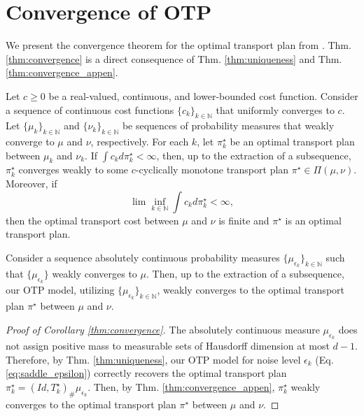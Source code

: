 \section{Convergence of OTP} \label{appen:conv_result_from_oldandnew}
We present the convergence theorem for the optimal transport plan from \citet{villani}. Thm. \ref{thm:convergence} is a direct consequence of Thm. \ref{thm:uniqueness} and Thm. \ref{thm:convergence_appen}.
\begin{theorem} \label{thm:convergence_appen}
    Let $c \ge 0$ be a real-valued, continuous, and lower-bounded cost function. Consider a sequence of continuous cost functions $\{c_k\}_{k\in \mathbb{N}}$ that uniformly converges to $c$.
    Let $\{\mu_k\}_{k\in \mathbb{N}}$ and $\{\nu_k\}_{k\in \mathbb{N}}$ be sequences of probability measures that weakly converge to $\mu$ and $\nu$, respectively. For each $k$, let $\pi^{\star}_k$ be an optimal transport plan between $\mu_k$ and $\nu_k$. If $\int c_k d\pi^{\star}_k <\infty$, then, up to the extraction of a subsequence, $\pi^{\star}_k$ converges weakly to some $c$-cyclically monotone transport plan $\pi^{\star} \in \Pi(\mu, \nu)$. Moreover, if
    \begin{equation}
        \lim\inf_{k\in\mathbb{N}} \int c_k d\pi^{\star}_k < \infty,
    \end{equation}
    then the optimal transport cost between $\mu$ and $\nu$ is finite and $\pi^{\star}$ is an optimal transport plan.
\end{theorem}

\begin{corollary} 
    Consider a sequence absolutely continuous probability measures $\{\mu_{\epsilon_k}\}_{k\in \mathbb{N}}$ such that $\{\mu_{\epsilon_k}\}$ weakly converges to $\mu$. Then, up to the extraction of a subsequence, our OTP model, utilizing $\{\mu_{\epsilon_k}\}_{k\in \mathbb{N}}$, weakly converges to the optimal transport plan $\pi^{\star}$ between $\mu$ and $\nu$.
\end{corollary}

\begin{proof}[Proof of Corollary \ref{thm:convergence}]
The absolutely continuous measure $\mu_{\epsilon_k}$ does not assign positive mass to measurable sets of Hausdorff dimension at most $d-1$. Therefore, by Thm. \ref{thm:uniqueness}, our OTP model for noise level $\epsilon_k$ (Eq. \ref{eq:saddle_epsilon}) correctly recovers the optimal transport plan $\pi_{k}^{\star} = (Id, T^{\star}_{k})_{\#} \mu_{\epsilon_k}$. Then, by Thm. \ref{thm:convergence_appen}, $\pi_{k}^{\star}$ weakly converges to the optimal transport plan $\pi^{\star}$ between $\mu$ and $\nu$.
\end{proof}

